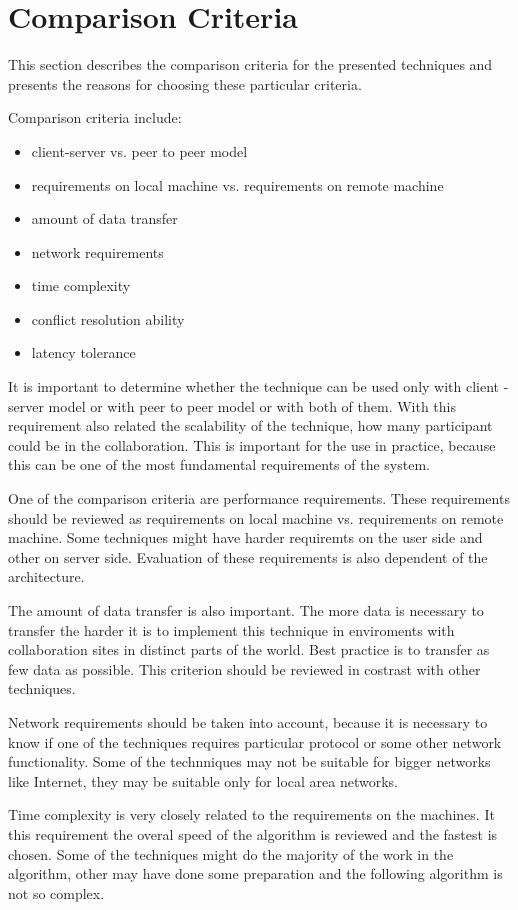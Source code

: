 \documentclass[12pt,oneside]{fithesis2}
\begin{document}
\section{Comparison Criteria}
This section describes the comparison criteria for the presented techniques and presents the reasons for choosing these particular criteria.
\par Comparison criteria include:
\begin{itemize}
\item client-server vs. peer to peer model
\item requirements on local machine vs. requirements on remote machine
\item amount of data transfer
\item network requirements
\item time complexity
\item conflict resolution ability
\item latency tolerance
\end{itemize}
\par It is important to determine whether the technique can be used only with client - server model or with peer to peer model or with both of them. With this requirement also related the scalability of the technique, how many participant could be in the collaboration. This is important for the use in practice, because this can be one of the most fundamental requirements of the system.
\par One of the comparison criteria are performance requirements. These requirements should be reviewed as requirements on local machine vs. requirements on remote machine. Some techniques might have harder requiremts on the user side and other on server side.  Evaluation of these requirements is also dependent of the architecture.
\par The amount of data transfer is also important. The more data is necessary to transfer the harder it is to implement this technique in enviroments with collaboration sites in distinct parts of the world. Best practice is to transfer as few data as possible. This criterion should be reviewed in costrast with other techniques.
\par Network requirements should be taken into account, because it is necessary to know if one of the techniques requires particular protocol or some other network functionality. Some of the technniques may not be suitable for bigger networks like Internet, they may be suitable only for local area networks.
\par Time complexity is very closely related to the requirements on the machines. It this requirement the overal speed of the algorithm is reviewed and the fastest is chosen. Some of the techniques might do the majority of the work in the algorithm, other may have done some preparation and the following algorithm is not so complex.
\end{document}

